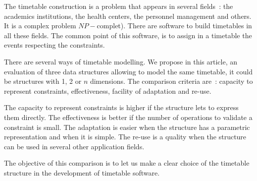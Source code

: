 The timetable construction is a problem that appears in several
fields~: the academics institutions, the health centers, the
personnel management and others. It is a complex problem
$NP-$complet). There are software to build timetables in all these
fields. The common point of this software, is to assign in a
timetable the events respecting the constraints.

There are several ways of timetable modelling. We propose in this
article, an evaluation of three data structures allowing to model
the same timetable, it could be structures with 1, 2 or $n$
dimensions. The comparison criteria are~: capacity to represent
constraints, effectiveness, facility of adaptation and re-use.

The capacity to represent constraints is higher if the structure
lets to express them directly. The effectiveness is better if the
number of operations to validate a constraint is small. The
adaptation is easier when the structure has a parametric
representation and when it is simple. The re-use is a quality when
the structure can be used in several other application fields.

The objective of this comparison is to let us make a clear choice
of the timetable structure in the development of timetable
software.
